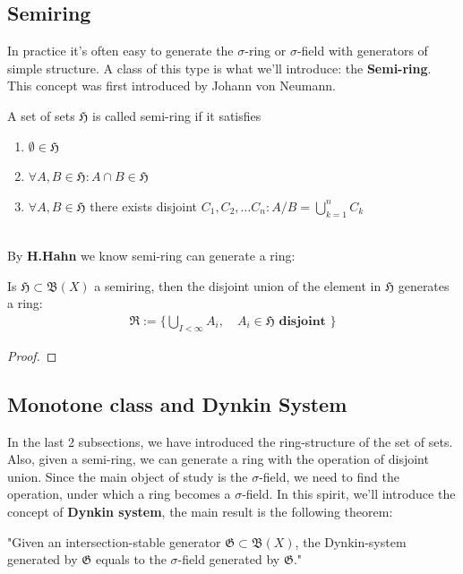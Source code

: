 \subsection{Semiring}
In practice it's often easy to generate the $\sigma$-ring or $\sigma$-field with generators of simple structure. A class of this type is what we'll introduce: the \textbf{Semi-ring}. This concept was first introduced by Johann von Neumann.
\begin{definition}
 A set of sets $\mathfrak{H}$ is called semi-ring if it satisfies
 \begin{enumerate}
 	\item $\emptyset \in \mathfrak{H}$
 	\item $\forall A, B \in \mathfrak{H}: A \cap B \in \mathfrak{H}$
 	\item $\forall A, B \in \mathfrak{H}$ there exists disjoint $C_1, C_2, \dots C_n: A\slash B = \bigcup_{k = 1}^n C_k$
 \end{enumerate}
\end{definition}
$\quad$\\
By \textbf{H.Hahn} we know semi-ring can generate a ring:
\begin{theorem}
	Is $\mathfrak{H} \subset \mathfrak{B}(X)$ a semiring, then the disjoint union of the element in $\mathfrak{H}$ generates a ring:
	\begin{align*}
		\mathfrak{R} := \{ \bigcup_{I < \infty} A_i,\quad \textbf{$A_i\in \mathfrak{H}$ disjoint } \} 
	\end{align*}
\end{theorem}
\begin{proof}
\end{proof}


\subsection{Monotone class and Dynkin System}
In the last 2 subsections, we have introduced the ring-structure of the set of sets. Also, given a semi-ring, we can generate a ring with the operation of disjoint union. Since the main object of study is the $\sigma$-field, we need to find the operation, under which a ring becomes a $\sigma$-field. In this spirit, we'll introduce the concept of \textbf{Dynkin system}, the main result is the following theorem:

	"Given an intersection-stable generator $\mathfrak{G} \subset \mathfrak{B}(X)$, the Dynkin-system generated by $\mathfrak{G}$ equals to the $\sigma$-field generated by $\mathfrak{G}$."
	 
